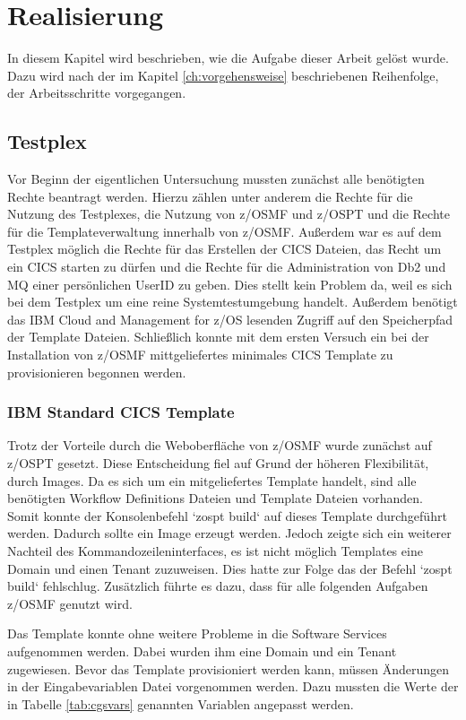 \chapter{Realisierung}\label{ch:realisierung}
In diesem Kapitel wird beschrieben, wie die Aufgabe dieser Arbeit gelöst wurde.
Dazu wird nach der im Kapitel \ref{ch:vorgehensweise} beschriebenen Reihenfolge, der Arbeitsschritte vorgegangen.

\section{Testplex}
Vor Beginn der eigentlichen Untersuchung mussten zunächst alle benötigten Rechte beantragt werden.
Hierzu zählen unter anderem die Rechte für die Nutzung des Testplexes, die Nutzung von z/OSMF und z/OSPT und die Rechte für die Templateverwaltung innerhalb von z/OSMF.
Außerdem war es auf dem Testplex möglich die Rechte für das Erstellen der CICS Dateien, das Recht um ein CICS starten zu dürfen und die Rechte für die Administration von Db2 und MQ einer persönlichen UserID zu geben.
Dies stellt kein Problem da, weil es sich bei dem Testplex um eine reine Systemtestumgebung handelt.
Außerdem benötigt das IBM Cloud and Management for z/OS lesenden Zugriff auf den Speicherpfad der Template Dateien.
Schließlich konnte mit dem ersten Versuch ein bei der Installation von z/OSMF mittgeliefertes minimales CICS Template zu provisionieren begonnen werden.

\subsection{IBM Standard CICS Template}
Trotz der Vorteile durch die Weboberfläche von z/OSMF wurde zunächst auf z/OSPT gesetzt.
Diese Entscheidung fiel auf Grund der höheren Flexibilität, durch Images.
Da es sich um ein mitgeliefertes Template handelt, sind alle benötigten Workflow Definitions Dateien und Template Dateien vorhanden.
Somit konnte der Konsolenbefehl `zospt build` auf dieses Template durchgeführt werden.
Dadurch sollte ein Image erzeugt werden.
Jedoch zeigte sich ein weiterer Nachteil des Kommandozeileninterfaces, es ist nicht möglich Templates eine Domain und einen Tenant zuzuweisen.
Dies hatte zur Folge das der Befehl `zospt build` fehlschlug.
Zusätzlich führte es dazu, dass für alle folgenden Aufgaben z/OSMF genutzt wird.

Das Template konnte ohne weitere Probleme in die Software Services aufgenommen werden.
Dabei wurden ihm eine Domain und ein Tenant zugewiesen.
Bevor das Template provisioniert werden kann, müssen Änderungen in der Eingabevariablen Datei vorgenommen werden.
Dazu mussten die Werte der in Tabelle \ref{tab:cgsvars} genannten Variablen angepasst werden.

